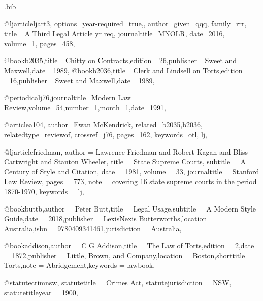 \begin{filecontents*}[overwrite]{\jobname.bib}


@ljarticle{ljart3,
options={year-required=true,},
author={given=qqq, family=rrr},
title ={A Third Legal Article yr req},
journaltitle={MNOLR},
date={2016},
volume={1},
pages={458},
}

@book{b2035,title ={Chitty on Contracts},edition ={26},publisher ={Sweet and Maxwell},date ={1989},}
@book{b2036,title ={Clerk and Lindsell on Torts},edition ={16},publisher ={Sweet and Maxwell},date ={1989},}

@periodical{j76,journaltitle={Modern Law Review},volume={54},number={1},month={1},date={1991},}

@article{a104,
author={Ewan McKendrick},
related={b2035,b2036},
relatedtype={reviewof},
crossref={j76},
pages={162},
keywords={otl, lj},
}




@ljarticle{friedman,
author = {Lawrence Friedman and Robert Kagan and Bliss Cartwright and Stanton Wheeler},
title = {State Supreme Courts},
subtitle = {A Century of Style and Citation},
date = {1981},
volume = {33},
journaltitle = {Stanford Law Review},
pages = {773},
note = {covering 16 state supreme courts in the period 1870-1970},
keywords = {lj},
}




@book{buttb,author = {Peter Butt},title = {Legal Usage},subtitle = {A Modern Style Guide},date = {2018},publisher = {LexisNexis Butterworths},location = {Australia},isbn = {9780409341461},jurisdiction = {Australia},}

@book{addison,author = {C G Addison},title = {The Law of Torts},edition = {2},date = {1872},publisher = {Little, Brown, and Company},location = {Boston},shorttitle = {Torts},note = {Abridgement},keywords = {lawbook},}


@statute{crimnsw,
statutetitle = {Crimes Act},
statutejurisdiction = {NSW},
statutetitleyear = {1900},%
}


\end{filecontents*}
